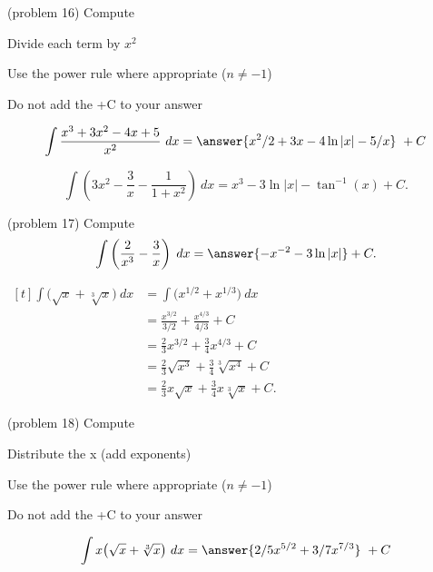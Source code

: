\documentclass[handout]{ximera}
\begin{document}
\begin{problem}(problem 16)
Compute


\begin{hint}
Divide each term by $x^2$
\end{hint}
\begin{hint}
Use the power rule where appropriate ($n\neq -1$)
\end{hint}
\begin{hint}
Do not add the +C to your answer
\end{hint}

\[
\int  \dfrac{x^3 + 3x^2 - 4x + 5}{x^2} \ dx =
\answer{x^2 /2 + 3x - 4\ln|x| -5/x} \ +  C
\]
\end{problem}



\begin{example}[example 17]
\[
\int \left(3x^2 - \dfrac{3}{x} - \dfrac{1}{1+x^2}\right) \ dx = x^3 - 3\ln|x| - \tan^{-1}(x) + C.
\]
\end{example}


\begin{problem}(problem 17)
Compute
\[
\int \left(\frac{2}{x^3} - \frac{3}{x} \right) \; dx = \answer{-x^{-2} -3\ln|x|} + C.
\]
\end{problem}

\begin{example}[example 18]
$\begin{aligned}[t]
\int \big(\sqrt x + \sqrt[3] x \big) \ dx &= \int \big(x^{1/2} + x^{1/3}\big) \ dx \\
&= \frac{x^{3/2}}{3/2} + \frac{x^{4/3}}{4/3} + C \\
&= \tfrac{2}{3} x^{3/2} + \tfrac{3}{4} x^{4/3} + C \\
&= \tfrac{2}{3} \sqrt {x^3} + \tfrac{3}{4}  \sqrt[3] {x^4} + C \\
&= \tfrac{2}{3} x\sqrt x + \tfrac{3}{4} x \sqrt[3] x + C.
\end{aligned}$
\end{example}


\begin{problem}(problem 18)
Compute

\begin{hint}
Distribute the x (add exponents)
\end{hint}
\begin{hint}
Use the power rule where appropriate ($n\neq -1$)
\end{hint}
\begin{hint}
Do not add the +C to your answer
\end{hint}

\[
\int  x\big(\sqrt x + \sqrt[3] x \big) \ dx =
\answer{2/5 x^{5/2} + 3/7 x^{7/3}} \ +  C
\]
\end{problem}
\end{document}
